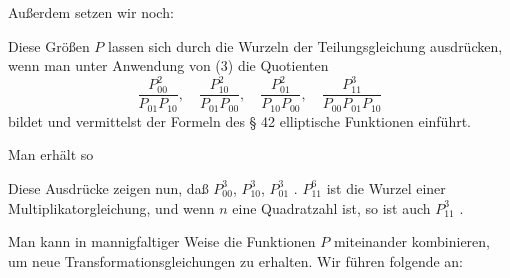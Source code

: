 Außerdem setzen wir noch:

Diese Größen $P$ lassen sich durch die Wurzeln der Teilungsgleichung ausdrücken, wenn man unter Anwendung von (3) die Quotienten
\[
\frac{P_{00}^2}{P_{01}P_{10}},\quad \frac{P_{10}^2}{P_{01}P_{00}},\quad \frac{P_{01}^2}{P_{10}P_{00}},\quad \frac{P_{11}^3}{P_{00}P_{01}P_{10}}
\]
bildet und vermittelst der Formeln des § 42 elliptische Funktionen einführt.

Man erhält so

Diese Ausdrücke zeigen nun, daß $P_{00}^3$, $P_{10}^3$, $P_{01}^3$ . $P_{11}^6$ ist die Wurzel einer Multiplikatorgleichung, und wenn $n$ eine Quadratzahl ist, so ist auch $P_{11}^3$ .

Man kann in mannigfaltiger Weise die Funktionen $P$ miteinander kombinieren, um neue Transformationsgleichungen zu erhalten. Wir führen folgende an:
